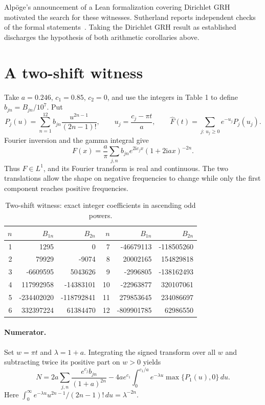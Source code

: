 \documentclass[11pt]{article}
\newcommand{\ii}{\mathrm i}
\begin{document}
Alp\"oge's announcement of a Lean formalization covering Dirichlet
GRH~\cite{alpoge} motivated the search for these witnesses. Sutherland reports
independent checks of the formal statements~\cite{sutherland}. Taking the
Dirichlet GRH result as established discharges the hypothesis of both
arithmetic corollaries above.

\newpage
\section{A two-shift witness}
Take $a=0.246$, $c_1=0.85$, $c_2=0$, and use the integers in Table 1 to
define $b_{jn}=B_{jn}/10^7$. Put
\[
 P_j(u)=\sum_{n=1}^{12} b_{jn}\frac{u^{2n-1}}{(2n-1)!},\qquad
 u_j=\frac{c_j-\pi t}{a},\qquad
 \widehat F(t)=\sum_{j:\,u_j\ge0}e^{-u_j}P_j(u_j).
\]
Fourier inversion and the gamma integral give
\[
 F(x)=\frac a\pi\sum_{j,n} b_{jn} e^{2\ii c_jx}(1+2\ii ax)^{-2n}.
\]
Thus $F\in L^1$, and its Fourier transform is real and continuous. The
two translations allow the shape on negative frequencies to change while
only the first component reaches positive frequencies.

\begin{table}[h]
\centering
\begin{tabular}{r rr@{\qquad}r rr}
\toprule
$n$ & $B_{1n}$ & $B_{2n}$ & $n$ & $B_{1n}$ & $B_{2n}$ \\
\midrule
1 & 1295 & 0 & 7 & -46679113 & -118505260 \\
2 & 79929 & -9074 & 8 & 20002165 & 154829818 \\
3 & -6609595 & 5043626 & 9 & -2996805 & -138162493 \\
4 & 117992958 & -14383101 & 10 & -22963877 & 320107061 \\
5 & -234402020 & -118792841 & 11 & 279853645 & 234086697 \\
6 & 332397224 & 61384470 & 12 & -809901785 & 62986550 \\
\bottomrule
\end{tabular}
\caption{Two-shift witness: exact integer coefficients in ascending odd powers.}
\end{table}

\paragraph{Numerator.} Set $w=\pi t$ and $\lambda=1+a$. Integrating the
signed transform over all $w$ and subtracting twice its positive part on
$w>0$ yields
\[
 N=2a\sum_{j,n}\frac{e^{c_j}b_{jn}}{(1+a)^{2n}}
       -4ae^{c_1}\int_0^{c_1/a}e^{-\lambda u}\max\{P_1(u),0\}\,du .
\]
Here $\int_0^\infty e^{-\lambda u}u^{2n-1}/(2n-1)!\,du=\lambda^{-2n}$.
\end{document}
